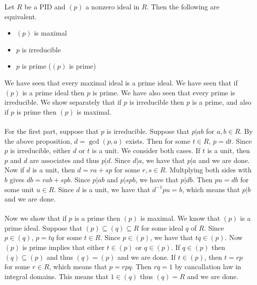 \documentclass[a4paper]{article}
\begin{document}
\begin{prp}{}{} Let $R$ be a PID and $(p)$ a nonzero ideal in $R$. Then the following are equivalent. 
\begin{itemize}
\item $(p)$ is maximal
\item $p$ is irreducible
\item $p$ is prime ($(p)$ is prime)
\end{itemize} \tcbline
We have seen that every maximal ideal is a prime ideal. We have seen that if $(p)$ is a prime ideal then $p$ is prime. We have also seen that every prime is irreducible. We show separately that if $p$ is irreducible then $p$ is a prime, and also if $p$ is prime then $(p)$ is maximal. \\~\\
For the first part, suppose that $p$ is irreducible. Suppose that $p|ab$ for $a,b\in R$. By the above proposition, $d=\gcd(p,a)$ exists. Then for some $t\in R$, $p=dt$. Since $p$ is irreducible, either $d$ or $t$ is a unit. We consider both cases. If $t$ is a unit, then $p$ and $d$ are associates and thus $p|d$. Since $d|a$, we have that $p|a$ and we are done. Now if $d$ is a unit, then $d=ra+sp$ for some $r,s\in R$. Multplying both sides with $b$ gives $db=rab+spb$. Since $p|ab$ and $p|spb$, we have that $p|db$. Then $pu=db$ for some unit $u\in R$. Since $d$ is a unit, we have that $d^{-1}pu=b$, which means that $p|b$ and we are done. \\~\\
Now we show that if $p$ is a prime then $(p)$ is maximal. We know that $(p)$ is a prime ideal. Suppose that $(p)\subseteq(q)\subseteq R$ for some ideal $q$ of $R$. Since $p\in(q)$, $p=tq$ for some $t\in R$. Since $p\in(p)$, we have that $tq\in(p)$. Now $(p)$ is prime implies that either $t\in(p)$ or $q\in(p)$. If $q\in(p)$ then $(q)\subseteq(p)$ and thus $(q)=(p)$ and we are done. If $t\in(p)$, then $t=rp$ for some $r\in R$, which means that $p=rpq$. Then $rq=1$ by cancallation law in integral domains. This means that $1\in(q)$ thus $(q)=R$ and we are done. 
\end{prp}
\end{document}
